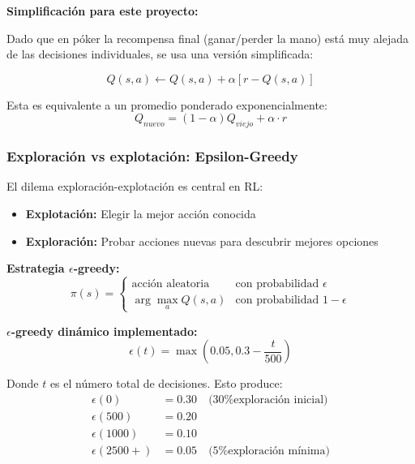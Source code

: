 \documentclass[12pt,a4paper]{article}
\begin{document}
\textbf{Simplificación para este proyecto:}

Dado que en póker la recompensa final (ganar/perder la mano) está muy alejada de las decisiones individuales, se usa una versión simplificada:

\begin{equation}
    Q(s, a) \leftarrow Q(s, a) + \alpha [r - Q(s, a)]
\end{equation}

Esta es equivalente a un promedio ponderado exponencialmente:
\begin{equation}
    Q_{nuevo} = (1-\alpha) Q_{viejo} + \alpha \cdot r
\end{equation}

\subsubsection{Exploración vs explotación: Epsilon-Greedy}

El dilema exploración-explotación es central en RL:
\begin{itemize}
    \item \textbf{Explotación:} Elegir la mejor acción conocida
    \item \textbf{Exploración:} Probar acciones nuevas para descubrir mejores opciones
\end{itemize}

\textbf{Estrategia $\epsilon$-greedy:}
\begin{equation}
    \pi(s) = \begin{cases}
        \text{acción aleatoria} & \text{con probabilidad } \epsilon \\
        \arg\max_a Q(s, a) & \text{con probabilidad } 1-\epsilon
    \end{cases}
\end{equation}

\textbf{$\epsilon$-greedy dinámico implementado:}
\begin{equation}
    \epsilon(t) = \max\left(0.05, 0.3 - \frac{t}{500}\right)
\end{equation}

Donde $t$ es el número total de decisiones. Esto produce:
\begin{align}
    \epsilon(0) &= 0.30 \quad \text{(30\% exploración inicial)} \\
    \epsilon(500) &= 0.20 \\
    \epsilon(1000) &= 0.10 \\
    \epsilon(2500+) &= 0.05 \quad \text{(5\% exploración mínima)}
\end{align}
\end{document}
